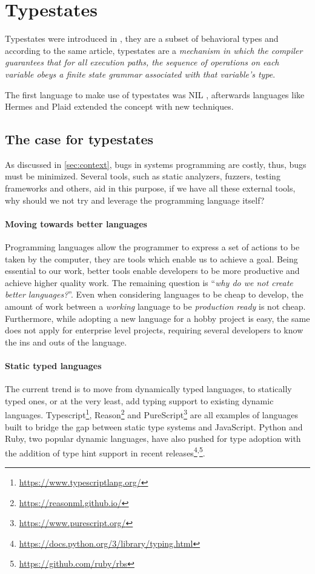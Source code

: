 \section{Typestates}\label{sec:typestates}

Typestates were introduced in \autocite{Strom1983},
they are a subset of behavioral types and
according to the same article, typestates are a
\emph{mechanism in which the compiler guarantees that for all execution paths,
the sequence of operations on each variable obeys a finite state grammar associated with that variable's type}.

The first language to make use of typestates was NIL \autocite{Strom1983},
afterwards languages like Hermes \autocite{Strom1990} and Plaid \autocite{Aldrich2009}
extended the concept with new techniques.

\subsection{The case for typestates}

As discussed in \autoref{sec:context}, bugs in systems programming are costly,
thus, bugs must be minimized.
Several tools, such as static analyzers, fuzzers, testing frameworks and others,
aid in this purpose, if we have all these external tools,
why should we not try and leverage the programming language itself?

\paragraph{Moving towards better languages}
Programming languages allow the programmer to express a set of actions to be taken by the computer,
they are tools which enable us to achieve a goal.
Being essential to our work, better tools enable developers to be more productive and achieve higher quality work.
The remaining question is “\emph{why do we not create better languages?}”.
Even when considering languages to be cheap to develop,
the amount of work between a \emph{working} language to be \emph{production ready} is not cheap.
Furthermore, while adopting a new language for a hobby project is easy,
the same does not apply for enterprise level projects,
requiring several developers to know the ins and outs of the language.

\paragraph{Static typed languages}
The current trend is to move from dynamically typed languages,
to statically typed ones, or at the very least, add typing support to existing dynamic languages.
Typescript\footnote{\url{https://www.typescriptlang.org/}},
Reason\footnote{\url{https://reasonml.github.io/}} and
PureScript\footnote{\url{https://www.purescript.org/}}
are all examples of languages built to bridge the gap between static type systems and JavaScript.
Python and Ruby, two popular dynamic languages, have also pushed for type adoption
with the addition of type hint support in recent
releases\footnote{\url{https://docs.python.org/3/library/typing.html}}\textsuperscript{,}\footnote{\url{https://github.com/ruby/rbs}}.


